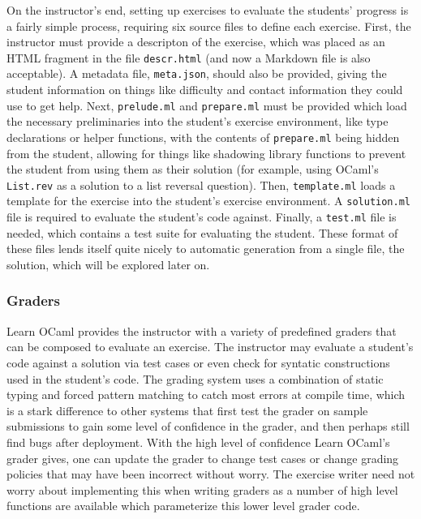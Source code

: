 \documentclass[11pt]{article}
\begin{document}
On the instructor's end,  setting up exercises to evaluate the students' progress is a fairly simple process, requiring six source files to define each exercise. First, the instructor must provide a descripton of the exercise, which was placed as an HTML fragment in the file \verb+descr.html+ (and now a Markdown file is also acceptable). A metadata file, \verb+meta.json+, should also be provided, giving the student information on things like difficulty and contact information they could use to get help. Next, \verb+prelude.ml+ and \verb+prepare.ml+ must be provided which load the necessary preliminaries into the student's exercise environment, like type declarations or helper functions, with the contents of \verb+prepare.ml+ being hidden from the student, allowing for things like shadowing library functions to prevent the student from using them as their solution (for example, using OCaml's \verb+List.rev+ as a solution to a list reversal question). Then, \verb+template.ml+ loads a template for the exercise into the student's exercise environment. A \verb+solution.ml+ file is required to evaluate the student's code against. Finally, a \verb+test.ml+ file is needed, which contains a test suite for evaluating the student. These format of these files lends itself quite nicely to automatic generation from a single file, the solution, which will be explored later on.

\subsubsection{Graders}
Learn OCaml provides the instructor with a variety of predefined graders that can be composed to evaluate an exercise. The instructor may evaluate a student's code against a solution via test cases or even check for syntatic constructions used in the student's code. The grading system uses a combination of static typing and forced pattern matching to catch most errors at compile time, which is a stark difference to other systems that first test the grader on sample submissions to gain some level of confidence in the grader, and then perhaps still find bugs after deployment. With the high level of confidence Learn OCaml's grader gives, one can update the grader to change test cases or change grading policies that may have been incorrect without worry. The exercise writer need not worry about implementing this when writing graders as a number of high level functions are available which parameterize this lower level grader code.
\end{document}
